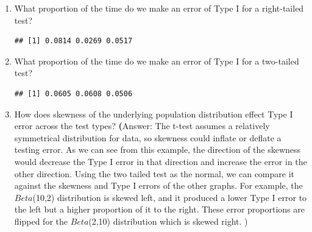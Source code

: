 \documentclass{article}\usepackage[]{graphicx}\usepackage[]{xcolor}
\makeatletter
\newenvironment{kframe}{%
 \def\at@end@of@kframe{}%
 \ifinner\ifhmode%
  \def\at@end@of@kframe{\end{minipage}}%
  \begin{minipage}{\columnwidth}%
 \fi\fi%
 \def\FrameCommand##1{\hskip\@totalleftmargin \hskip-\fboxsep
 \colorbox{shadecolor}{##1}\hskip-\fboxsep
     \hskip-\linewidth \hskip-\@totalleftmargin \hskip\columnwidth}%
 \MakeFramed {\advance\hsize-\width
   \@totalleftmargin\z@ \linewidth\hsize
   \@setminipage}}%
 {\par\unskip\endMakeFramed%
 \at@end@of@kframe}
\newenvironment{knitrout}{}{} %
\makeatother
\begin{document}
\begin{enumerate}
\begin{enumerate}
    \item What proportion of the time do we make an error of Type I for a
    right-tailed test?
\begin{knitrout}\scriptsize
{}\color{fgcolor}\begin{kframe}
\begin{verbatim}
## [1] 0.0814 0.0269 0.0517
\end{verbatim}
\end{kframe}
\end{knitrout}
    
    \item What proportion of the time do we make an error of Type I for a
    two-tailed test?
\begin{knitrout}\scriptsize
{}\color{fgcolor}\begin{kframe}
\begin{verbatim}
## [1] 0.0605 0.0608 0.0506
\end{verbatim}
\end{kframe}
\end{knitrout}

   \item How does skewness of the underlying population distribution effect
    Type I error across the test types?
    \textbf(Answer: The t-test assumes a relatively symmetrical distribution for data, so skewness could inflate or deflate a testing error. As we can see from this example, the direction of the skewness would decrease the Type I error in that direction and increase the error in the other direction. Using the two tailed test as the normal, we can compare it against the skewness and Type I errors of the other graphs. For example, the $Beta$(10,2) distribution is skewed left, and it produced a lower Type I error to the left but a higher proportion of it to the right. These error proportions are flipped for the $Beta$(2,10) distribution which is skewed right. )
    
  \end{enumerate}
\end{enumerate}

\end{document}
